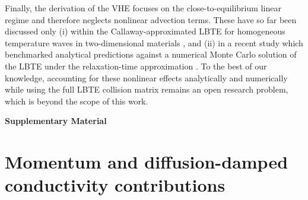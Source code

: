 \documentclass[
prb,
twocolumn,
superscriptaddress,
 amsmath,amssymb,
 aps,
longbibliography,
]{revtex4-2}
\begin{document}
Finally, the derivation of the VHE focuses on the close-to-equilibrium linear regime and therefore neglects nonlinear advection terms. These have so far been discussed only (i) within the Callaway-approximated LBTE for homogeneous temperature waves in two-dimensional materials \cite{shang_unified_2022}, and (ii) in a recent study which benchmarked analytical predictions against a numerical Monte Carlo solution of the LBTE under the relaxation-time approximation \cite{yadavDerivationGeneralizedHeat2025a}. To the best of our knowledge, accounting for these nonlinear effects analytically and numerically while using the full LBTE collision matrix remains an open research problem, which is beyond the scope of this work.


\clearpage

\setcounter{figure}{0}
\renewcommand{\thefigure}{SF \arabic{figure}}
\renewcommand{\theequation}{SE \arabic{equation}}

\begin{center}
  {\Large\textbf{Supplementary Material}}
\end{center}

\section{Momentum and diffusion-damped conductivity contributions}
\label{sec:mom_contribution_k}
\end{document}
